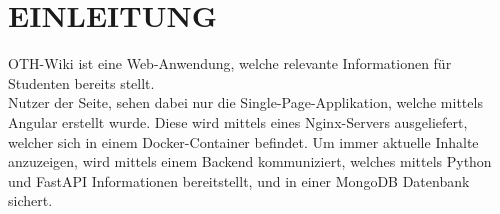 \section{EINLEITUNG}\label{ch:einleitung}

OTH-Wiki ist eine Web-Anwendung, welche relevante Informationen für Studenten bereits stellt. \\ 
Nutzer der Seite, sehen dabei nur die Single-Page-Applikation, welche mittels Angular erstellt wurde.
Diese wird mittels eines Nginx-Servers ausgeliefert, welcher sich in einem Docker-Container befindet.
Um immer aktuelle Inhalte anzuzeigen, wird mittels einem Backend kommuniziert, welches mittels Python und FastAPI Informationen bereitstellt, und in einer MongoDB Datenbank sichert.